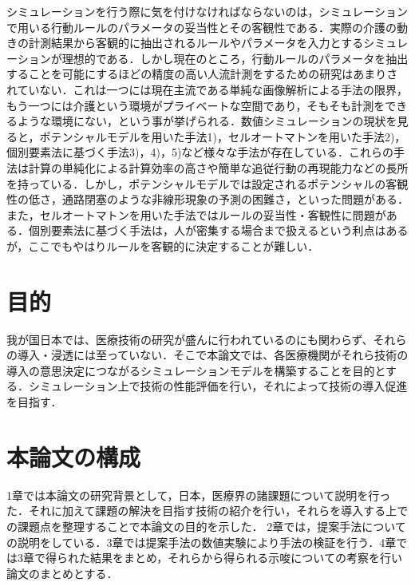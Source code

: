 シミュレーションを行う際に気を付けなければならないのは，シミュレーションで用いる行動ルールのパラメータの妥当性とその客観性である．実際の介護の動きの計測結果から客観的に抽出されるルールやパラメータを入力とするシミュレーションが理想的である．しかし現在のところ，行動ルールのパラメータを抽出することを可能にするほどの精度の高い人流計測をするための研究はあまりされていない．これは一つには現在主流である単純な画像解析による手法の限界，もう一つには介護という環境がプライベートな空間であり，そもそも計測をできるような環境にない，という事が挙げられる．数値シミュレーションの現状を見ると，ポテンシャルモデルを用いた手法1)，セルオートマトンを用いた手法2)，個別要素法に基づく手法3)，4)，5)など様々な手法が存在している．これらの手法は計算の単純化による計算効率の高さや簡単な追従行動の再現能力などの長所を持っている．しかし，ポテンシャルモデルでは設定されるポテンシャルの客観性の低さ，通路閉塞のような非線形現象の予測の困難さ，といった問題がある．また，セルオートマトンを用いた手法ではルールの妥当性・客観性に問題がある．個別要素法に基づく手法は，人が密集する場合まで扱えるという利点はあるが，ここでもやはりルールを客観的に決定することが難しい．

\section{目的}

我が国日本では、医療技術の研究が盛んに行われているのにも関わらず、それらの導入・浸透には至っていない．そこで本論文では、各医療機関がそれら技術の導入の意思決定につながるシミュレーションモデルを構築することを目的とする．シミュレーション上で技術の性能評価を行い，それによって技術の導入促進を目指す．

\section{本論文の構成}

1章では本論文の研究背景として，日本，医療界の諸課題について説明を行った．それに加えて課題の解決を目指す技術の紹介を行い，それらを導入する上での課題点を整理することで本論文の目的を示した．
2章では，提案手法についての説明をしている．3章では提案手法の数値実験により手法の検証を行う．4章では3章で得られた結果をまとめ，それらから得られる示唆についての考察を行い論文のまとめとする．
